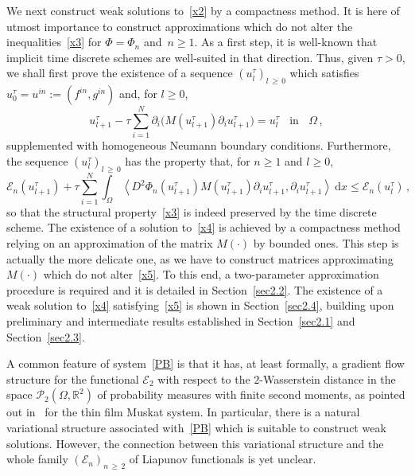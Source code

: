 \documentclass[AHL,Unicode,longabstracts,published]{cedram}
\newcommand{\bbR}{\mathbb{R}}
\newcommand{\clE}{\mathcal{E}}
\newcommand{\rmd}{\mathrm{d}}
\newcommand{\clP}{\mathcal{P}}
\newcommand{\clE}{\mathcal{E}}
\begin{document}
We next construct weak solutions to~\eqref{x2} by a compactness method. It is here of utmost importance to construct approximations which do not alter the inequalities~\eqref{x3} for $\Phi=\Phi_n$ and~${n\ge 1}$. As a first step, it is well-known that implicit time discrete schemes are well-suited in that direction. Thus, given $\tau>0$, we shall first prove the existence of a sequence $(u^\tau_l)_{l\,\ge\,0}$ which satisfies~${u^\tau_0=u^{in}:=(f^{in},g^{in})}$ and, for $l\ge 0$,
\begin{equation}\label{x4}
u^\tau_{l+1} - \tau \sum_{i=1}^N\partial_i \Big(M(u^\tau_{l+1})\partial_i u^\tau_{l+1}\Big) = u^\tau_l \;\;\text{ in }\;\; \Omega\,, 
\end{equation}
supplemented with homogeneous Neumann boundary conditions. Furthermore, the sequence $(u^\tau_l)_{l\,\ge\,0}$ has the property that, for $n\ge 1$ and $l\ge 0$,
\begin{equation}\label{x5}
\clE_n\left(u_{l+1}^\tau\right) + \tau \sum_{i=1}^N\int_\Omega \left\langle D^2\Phi_n\left(u_{l+1}^\tau\right) M\left(u_{l+1}^\tau\right) \partial_i u_{l+1}^\tau, \partial_i u_{l+1}^\tau \right\rangle\ \rmd x \le \clE_n(u_{l}^\tau)\,, 
\end{equation}
so that the structural property~\eqref{x3} is indeed preserved by the time discrete scheme. The existence of a solution to~\eqref{x4} is achieved by a compactness method relying on an approximation of the matrix $M(\cdot)$ by bounded ones. This step is actually the more delicate one, as we have to construct matrices approximating $M(\cdot)$ which do not alter~\eqref{x5}. To this end, a two-parameter approximation procedure is required and it is detailed in Section~\ref{sec2.2}. The existence of a weak solution to~\eqref{x4} satisfying~\eqref{x5} is shown in Section~\ref{sec2.4}, building upon preliminary and intermediate results established in Section~\ref{sec2.1} and Section~\ref{sec2.3}.


\begin{rema}\label{rem.W}
A common feature of system~\eqref{PB} is that it has, at least formally, a gradient flow structure for the functional $\clE_2$ with respect to the $2$-Wasserstein distance in the space $\clP_2(\Omega,\bbR^2)$ of probability measures with finite second moments, as pointed out in~\cite{LM2013,ACCL2019} for the thin film Muskat system. In particular, there is a natural variational structure associated with~\eqref{PB} which is suitable to construct weak solutions. However, the connection between this variational structure and the whole family $(\clE_n)_{n\,\ge\,2}$ of Liapunov functionals is yet unclear.
\end{rema}
\end{document}
